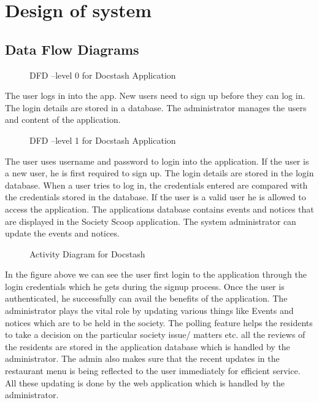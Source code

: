 \chapter{Design of system}
\newpage

\section{Data Flow Diagrams}
\begin{figure}[h]
  \begin{center}
    \caption{DFD –level 0 for Docstash Application }
    \label{7}
\end{center}
\end{figure}

\vspace{0.2cm} The user logs in into the app. New users need to sign up before they can log in. The login details are stored in a database. The administrator manages the users and content of the application.

\begin{figure}[h]
\begin{center}
    \caption{DFD –level 1 for Docstash Application }
    \label{8}
\end{center}
\end{figure}

       \vspace{0.2cm}The user uses username and password to login into the application. If the user is a new user, he is first required to sign up. The login details are stored in the login database. When a user tries to log in, the credentials entered are compared with the credentials stored in the database. If the user is a valid user he is allowed to access the application.
The applications database contains events and notices that are displayed in the Society Scoop application. The system administrator can update the events and notices.


\begin{figure}[h]
    \begin{center}
    \caption{Activity Diagram for Docstash }
    \label{9}
    \end{center}
    \end{figure}

\vspace{0.2cm}In the figure above we can see the user first login to the application through the login credentials which he gets during the signup process. Once the user is authenticated, he successfully can avail the benefits of the application. The administrator plays the vital role by updating various things like Events and notices which are to be held in the society.
The polling feature helps the residents to take a decision on the particular society issue/ matters etc. all the reviews of the residents are stored in the application database which is handled by the administrator. The admin also makes sure that the recent updates in the restaurant menu is being reflected to the user immediately for efficient service. All these updating is done by the web application which is handled by the administrator.

